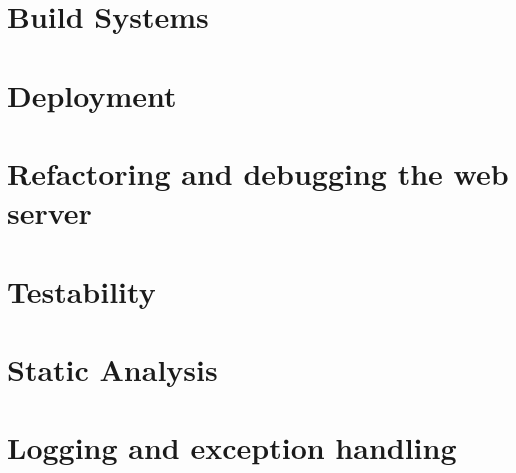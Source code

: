\documentclass{article}
\begin{document}
\pagebreak

\section{Build Systems}

\pagebreak

\section{Deployment}

\pagebreak

\section{Refactoring and debugging the web server}

\pagebreak

\section{Testability}

\pagebreak

\section{Static Analysis}

\pagebreak

\section{Logging and exception handling}

\pagebreak
\end{document}
